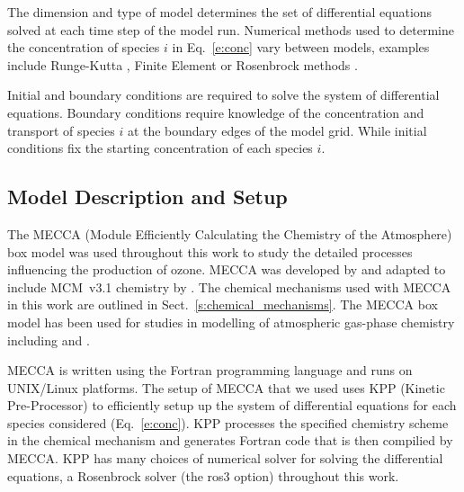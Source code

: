 The dimension and type of model determines the set of differential equations solved at each time step of the model run. 
Numerical methods used to determine the concentration of species $i$ in Eq.~\eqref{e:conc} vary between models, examples include Runge-Kutta \citep{Sandu:1997b}, Finite Element \citep{Russell:2000} or Rosenbrock methods \citep{Sandu:1997a}.

Initial and boundary conditions are required to solve the system of differential equations.
Boundary conditions require knowledge of the concentration and transport of species $i$ at the boundary edges of the model grid.
While initial conditions fix the starting concentration of each species $i$.

\subsection{Model Description and Setup} \label{ss:model_setup}
The MECCA (Module Efficiently Calculating the Chemistry of the Atmosphere) box model was used throughout this work to study the detailed processes influencing the production of ozone.
MECCA was developed by \citet{Sander:2005} and adapted to include MCM~v3.1 chemistry by \citet{Butler:2011}.
The chemical mechanisms used with MECCA in this work are outlined in Sect.~\ref{s:chemical_mechanisms}.
The MECCA box model has been used for studies in modelling of atmospheric gas-phase chemistry including \citet{Kubistin:2010} and \citet{Lourens:2016}.

MECCA is written using the Fortran programming language and runs on UNIX/Linux platforms.
The setup of MECCA that we used uses KPP (Kinetic Pre-Processor) \citep{Damian:2002} to efficiently setup up the system of differential equations for each species considered (Eq.~\eqref{e:conc}).
KPP processes the specified chemistry scheme in the chemical mechanism and generates Fortran code that is then compilied by MECCA.
KPP has many choices of numerical solver for solving the differential equations, a Rosenbrock solver (the ros3 option) throughout this work.

